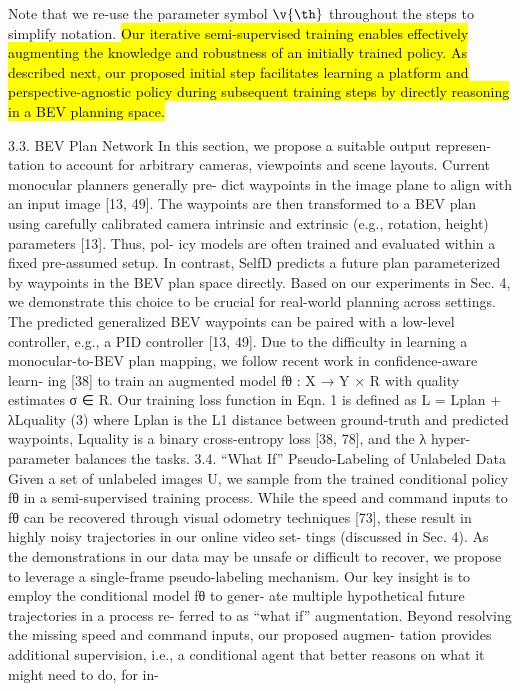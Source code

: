 \documentclass[letterpaper, 12pt]{article}
\theoremstyle{definition}
\theoremstyle{definition}
\theoremstyle{definition}
\theoremstyle{definition}
\theoremstyle{definition}
\begin{document}
Note that we re-use the parameter symbol \(\v{\th}\) throughout
the steps to simplify notation. \hl{Our iterative semi-supervised
training enables effectively augmenting the knowledge and
robustness of an initially trained policy. As described
next, our proposed initial step facilitates learning a platform
and perspective-agnostic policy during subsequent training
steps by directly reasoning in a BEV planning space.} 

3.3. BEV Plan Network
In this section, we propose a suitable output represen-
tation to account for arbitrary cameras, viewpoints and
scene layouts. Current monocular planners generally pre-
dict waypoints in the image plane to align with an input
image [13, 49]. The waypoints are then transformed to a
BEV plan using carefully calibrated camera intrinsic and
extrinsic (e.g., rotation, height) parameters [13]. Thus, pol-
icy models are often trained and evaluated within a fixed
pre-assumed setup. In contrast, SelfD predicts a future plan
parameterized by waypoints in the BEV plan space directly.
Based on our experiments in Sec. 4, we demonstrate this
choice to be crucial for real-world planning across settings.
The predicted generalized BEV waypoints can be paired
with a low-level controller, e.g., a PID controller [13, 49].
Due to the difficulty in learning a monocular-to-BEV plan
mapping, we follow recent work in confidence-aware learn-
ing [38] to train an augmented model fθ : X → Y × R
with quality estimates σ ∈ R. Our training loss function in
Eqn. 1 is defined as
L = Lplan + λLquality
(3)
where Lplan is the L1 distance between ground-truth and
predicted waypoints, Lquality is a binary cross-entropy
loss [38, 78], and the λ hyper-parameter balances the tasks.
3.4. “What If” Pseudo-Labeling of Unlabeled Data
Given a set of unlabeled images U, we sample from the
trained conditional policy fθ in a semi-supervised training
process. While the speed and command inputs to fθ can be
recovered through visual odometry techniques [73], these
result in highly noisy trajectories in our online video set-
tings (discussed in Sec. 4). As the demonstrations in our
data may be unsafe or difficult to recover, we propose to
leverage a single-frame pseudo-labeling mechanism. Our
key insight is to employ the conditional model fθ to gener-
ate multiple hypothetical future trajectories in a process re-
ferred to as “what if” augmentation. Beyond resolving the
missing speed and command inputs, our proposed augmen-
tation provides additional supervision, i.e., a conditional
agent that better reasons on what it might need to do, for in-
\end{document}
